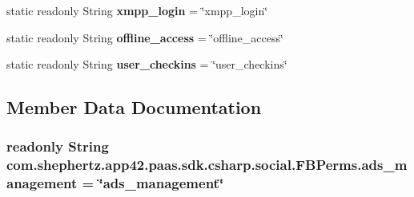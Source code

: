 \begin{DoxyCompactItemize}
\item 
\hypertarget{classcom_1_1shephertz_1_1app42_1_1paas_1_1sdk_1_1csharp_1_1social_1_1_f_b_perms_a3b784e05553a8572bbf657ce781ee4e0}{static readonly String {\bfseries xmpp\+\_\+login} = \char`\"{}xmpp\+\_\+login\char`\"{}}\label{classcom_1_1shephertz_1_1app42_1_1paas_1_1sdk_1_1csharp_1_1social_1_1_f_b_perms_a3b784e05553a8572bbf657ce781ee4e0}

\item 
\hypertarget{classcom_1_1shephertz_1_1app42_1_1paas_1_1sdk_1_1csharp_1_1social_1_1_f_b_perms_a5b22bf255ac683eef246c60d72f113c1}{static readonly String {\bfseries offline\+\_\+access} = \char`\"{}offline\+\_\+access\char`\"{}}\label{classcom_1_1shephertz_1_1app42_1_1paas_1_1sdk_1_1csharp_1_1social_1_1_f_b_perms_a5b22bf255ac683eef246c60d72f113c1}

\item 
\hypertarget{classcom_1_1shephertz_1_1app42_1_1paas_1_1sdk_1_1csharp_1_1social_1_1_f_b_perms_a7bf9a6abe928f7c1128d3858d72c2b64}{static readonly String {\bfseries user\+\_\+checkins} = \char`\"{}user\+\_\+checkins\char`\"{}}\label{classcom_1_1shephertz_1_1app42_1_1paas_1_1sdk_1_1csharp_1_1social_1_1_f_b_perms_a7bf9a6abe928f7c1128d3858d72c2b64}

\end{DoxyCompactItemize}


\subsection{Member Data Documentation}
\hypertarget{classcom_1_1shephertz_1_1app42_1_1paas_1_1sdk_1_1csharp_1_1social_1_1_f_b_perms_a7081e128f11c291eca7640163c3032e7}{
\subsubsection[{ads\+\_\+management}]{\setlength{\rightskip}{0pt plus 5cm}readonly String com.\+shephertz.\+app42.\+paas.\+sdk.\+csharp.\+social.\+F\+B\+Perms.\+ads\+\_\+management = \char`\"{}ads\+\_\+management\char`\"{}\hspace{0.3cm}{\ttfamily [static]}}}\label{classcom_1_1shephertz_1_1app42_1_1paas_1_1sdk_1_1csharp_1_1social_1_1_f_b_perms_a7081e128f11c291eca7640163c3032e7}


